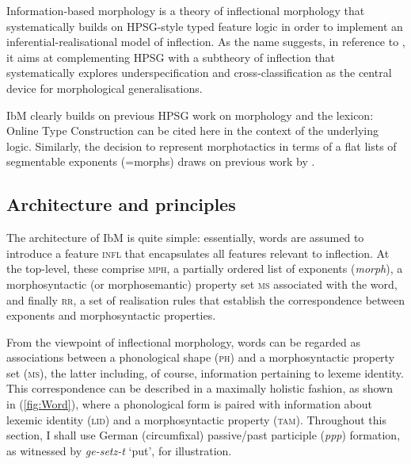 \documentclass[output=paper
	        ,collection
	        ,collectionchapter
 	        ,biblatex
                ,babelshorthands
                ,newtxmath
                ,draftmode
                ,colorlinks, citecolor=brown
]{langscibook}
\begin{document}
\begin{exe}
\begin{xlist}
Information-based morphology \citep{Crysmann:Bonami:2016} is a theory
of inflectional morphology that systematically builds on HPSG-style
typed feature logic in order to implement an inferential-realisational
model of inflection. As the name suggests, in reference to
\citet{Pollard87}, it aims at complementing HPSG with a 
subtheory of inflection that systematically 
explores underspecification and cross-classification as the central
device for morphological generalisations.

IbM clearly builds on previous HPSG work on morphology and the
lexicon: Online Type Construction \citep{Koenig94} can be cited here
in the context of the underlying logic. Similarly, the decision to
represent morphotactics in terms of a flat lists of segmentable
exponents (=morphs) draws on previous work by
\citet{crysmann_b03book}. 


\subsection{Architecture and principles}

The architecture of IbM is quite simple: essentially, words are
assumed to introduce a feature \textsc{infl} that encapsulates all
features relevant to inflection. At the top-level, these comprise
\textsc{mph}, a partially ordered list of exponents (\textit{morph}),
a morphosyntactic (or morphosemantic) property set \textsc{ms}
associated with the word, and finally \textsc{rr}, a set  of
realisation rules that establish the correspondence between exponents
and morphosyntactic properties.   

\begin{exe}
  \ex
{}

\end{exe}

From the viewpoint of inflectional morphology, words can be regarded
as associations between a phonological shape (\textsc{ph}) and a
morphosyntactic property set (\textsc{ms}), the latter including, of
course, information pertaining to lexeme identity. This correspondence
can be described in a maximally holistic fashion, as shown in 
(\ref{fig:Word}), where a phonological form is paired with information
about lexemic identity (\textsc{lid}) and a morphosyntactic property (\textsc{tam}). Throughout this section, I shall use German
(circumfixal) passive/past participle (\emph{ppp}) formation, as
witnessed by \textit{ge-\emph{setz}-t} `put', for illustration.


\end{xlist}
\end{exe}
\end{document}
